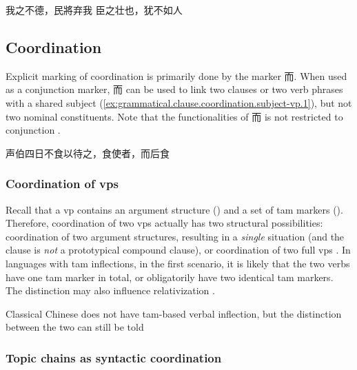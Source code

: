 \documentclass[UTF8, a4paper, oneside, scheme=plain, 12pt]{ctexrep}
\newcommand*{\citepage}[1]{p.~{#1}}
\newcommand*{\citepages}[1]{pp.~{#1}}
\begin{document}
\begin{exe}
    \ex\label{ex:grammatical.clause.linking.gerundive.condition.1} 我之不德，民將弃我
    \ex\label{ex:grammatical.clause.linking.gerundive.temporal.1} 臣之壮也，犹不如人
\end{exe}

\subsection{Coordination}\label{sec:grammatical.clause.coordination}

Explicit marking of coordination is primarily done by the marker 而.
When used as a conjunction marker, 而 can be used to link two clauses 
or two verb phrases with a shared subject (\ref{ex:grammatical.clause.coordination.subject-vp.1}),
but not two nominal constituents.
Note that the functionalities of 而 is not restricted to conjunction \citep[\citepage{183}]{meiguang2018}.

\begin{exe}
    \ex\label{ex:grammatical.clause.coordination.subject-vp.1} 
    声伯四日不食以待之，食使者，而后食
\end{exe}

\subsubsection{Coordination of \acp{vp}}\label{sec:grammatical.clause.coordination.vp}

Recall that a \ac{vp} contains an argument structure () and a set of \ac{tam} markers ().
Therefore, coordination of two \acp{vp} actually has two structural possibilities:
coordination of two argument structures, resulting in a \emph{single} situation
(and the clause is \emph{not} a prototypical compound clause),
or coordination of two full \acp{vp}
\citep[\citepages{192-201}]{meiguang2018}.
In languages with \ac{tam} inflections, in the first scenario,
it is likely that the two verbs have one \ac{tam} marker in total,
or obligatorily have two identical \ac{tam} markers.
The distinction may also influence relativization \citep[\citepage{207}]{meiguang2018}.

Classical Chinese does not have \ac{tam}-based verbal inflection,
but the distinction between the two can still be told 

\subsubsection{Topic chains as syntactic coordination}\label{sec:grammatical.clause.coordination.topic-chain}
\end{document}
